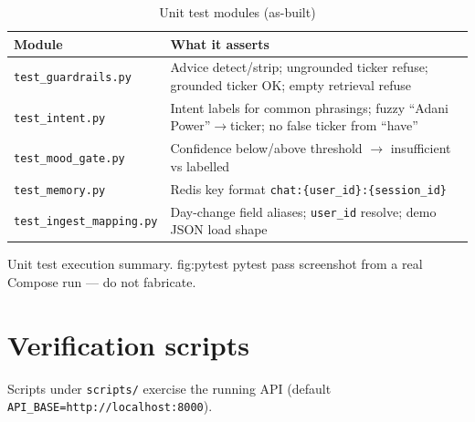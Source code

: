 \begin{table}[!htbp]
\centering
\small
\caption{Unit test modules (as-built)}
\label{tab:unit-tests}
\begin{tabularx}{\textwidth}{@{}
  >{\raggedright\arraybackslash}p{}
  >{\raggedright\arraybackslash}X
  @{}}
\toprule
\textbf{Module} & \textbf{What it asserts} \\
\midrule
\texttt{test\_guardrails.py} & Advice detect/strip; ungrounded ticker refuse; grounded ticker OK; empty retrieval refuse \\
\addlinespace
\texttt{test\_intent.py} & Intent labels for common phrasings; fuzzy ``Adani Power''$\rightarrow$ticker; no false ticker from ``have'' \\
\addlinespace
\texttt{test\_mood\_gate.py} & Confidence below/above threshold $\rightarrow$ insufficient vs labelled \\
\addlinespace
\texttt{test\_memory.py} & Redis key format \texttt{chat:\{user\_id\}:\{session\_id\}} \\
\addlinespace
\texttt{test\_ingest\_mapping.py} & Day-change field aliases; \texttt{user\_id} resolve; demo JSON load shape \\
\bottomrule
\end{tabularx}
\end{table}

%
{Unit test execution summary.}%
{fig:pytest}%
{pytest pass screenshot from a real Compose run --- do not fabricate.}

\section{Verification scripts}

Scripts under \texttt{scripts/} exercise the running API (default \texttt{API\_BASE=http://localhost:8000}).

